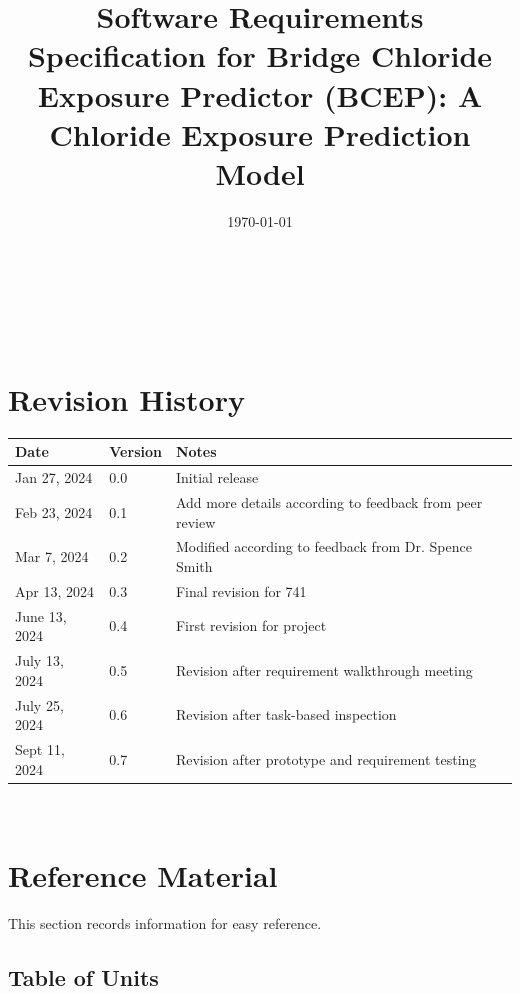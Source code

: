 \documentclass[12pt]{article}
\begin{document}
\title{Software Requirements Specification for Bridge Chloride Exposure Predictor (BCEP): A Chloride Exposure Prediction Model} 
\author{\authname}
\date{\today}
	
\maketitle

~\newpage


\tableofcontents

~\newpage

\section*{Revision History}

\begin{tabularx}{\textwidth}{p{3cm}p{2cm}X}
\toprule {\bf Date} & {\bf Version} & {\bf Notes}\\
\midrule
Jan 27, 2024 & 0.0 & Initial release\\ 
Feb 23, 2024 & 0.1 & Add more details according to feedback from peer review\\
Mar 7, 2024 & 0.2 & Modified according to feedback from Dr. Spence Smith\\
Apr 13, 2024 & 0.3 & Final revision for 741\\
June 13, 2024 & 0.4 & First revision for project\\
July 13, 2024 & 0.5 & Revision after requirement walkthrough meeting\\
July 25, 2024 & 0.6 & Revision after task-based inspection\\
Sept 11, 2024 & 0.7 & Revision after prototype and requirement testing\\
\bottomrule
\end{tabularx}

~\newpage

\section{Reference Material}

This section records information for easy reference.

\subsection{Table of Units}
\end{document}
